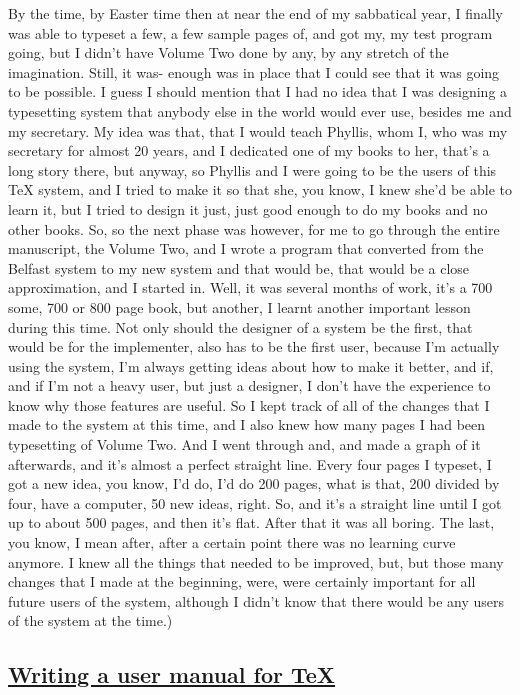 \documentclass[]{article}
\begin{document}
By the time, by Easter time then at near the end of my sabbatical year,
I finally was able to typeset a few, a few sample pages of, and got my,
my test program going, but I didn't have Volume Two done by any, by any
stretch of the imagination. Still, it was- enough was in place that I
could see that it was going to be possible. I guess I should mention
that I had no idea that I was designing a typesetting system that
anybody else in the world would ever use, besides me and my secretary.
My idea was that, that I would teach Phyllis, whom I, who was my
secretary for almost 20 years, and I dedicated one of my books to her,
that's a long story there, but anyway, so Phyllis and I were going to be
the users of this TeX system, and I tried to make it so that she, you
know, I knew she'd be able to learn it, but I tried to design it just,
just good enough to do my books and no other books. So, so the next
phase was however, for me to go through the entire manuscript, the
Volume Two, and I wrote a program that converted from the Belfast system
to my new system and that would be, that would be a close approximation,
and I started in. Well, it was several months of work, it's a 700 some,
700 or 800 page book, but another, I learnt another important lesson
during this time. Not only should the designer of a system be the first,
that would be for the implementer, also has to be the first user,
because I'm actually using the system, I'm always getting ideas about
how to make it better, and if, and if I'm not a heavy user, but just a
designer, I don't have the experience to know why those features are
useful. So I kept track of all of the changes that I made to the system
at this time, and I also knew how many pages I had been typesetting of
Volume Two. And I went through and, and made a graph of it afterwards,
and it's almost a perfect straight line. Every four pages I typeset, I
got a new idea, you know, I'd do, I'd do 200 pages, what is that, 200
divided by four, have a computer, 50 new ideas, right. So, and it's a
straight line until I got up to about 500 pages, and then it's flat.
After that it was all boring. The last, you know, I mean after, after a
certain point there was no learning curve anymore. I knew all the things
that needed to be improved, but, but those many changes that I made at
the beginning, were, were certainly important for all future users of
the system, although I didn't know that there would be any users of the
system at the time.)

\subsection{\texorpdfstring{\href{http://webofstories.com/play/17119}{Writing
a user manual for
TeX}}{Writing a user manual for TeX}}\label{writing-a-user-manual-for-tex}
\end{document}
